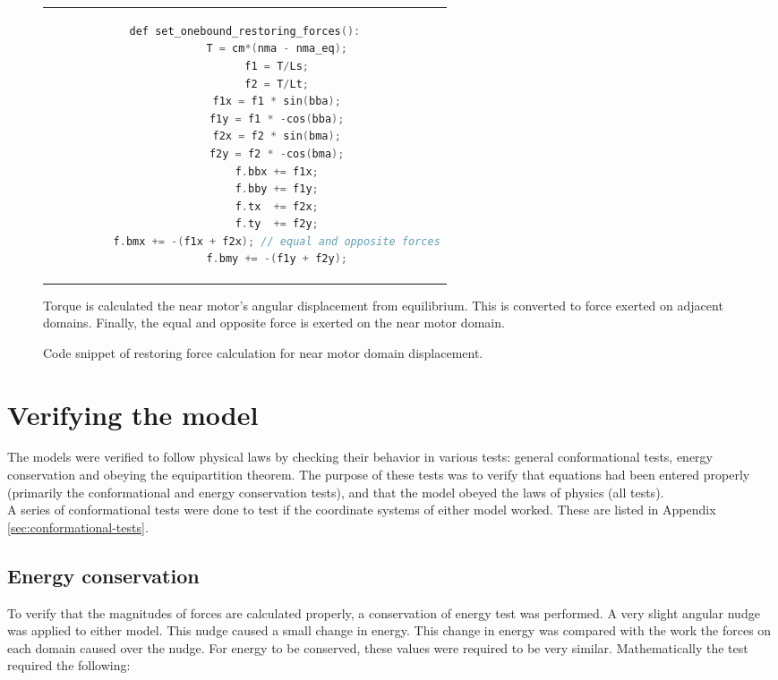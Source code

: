 \documentclass[
11pt, %
english, %
singlespacing, %
headsepline, %
chapterinoneline, %
]{MastersDoctoralThesis} %
\begin{document}
\begin{figure}[h]
  \centering
  \begin{tabular}{c}
    \begin{lstlisting}[language=C++]
      def set_onebound_restoring_forces():
          T = cm*(nma - nma_eq);
          f1 = T/Ls;
          f2 = T/Lt;
          f1x = f1 * sin(bba);
          f1y = f1 * -cos(bba);
          f2x = f2 * sin(bma);
          f2y = f2 * -cos(bma);
          f.bbx += f1x;
          f.bby += f1y;
          f.tx  += f2x;
          f.ty  += f2y;
          f.bmx += -(f1x + f2x); // equal and opposite forces
          f.bmy += -(f1y + f2y);
    \end{lstlisting}
  \end{tabular}
  \caption{Code snippet of restoring force calculation for near motor domain displacement.}{Torque is calculated the near motor's angular displacement from equilibrium. This is converted to force exerted on adjacent domains. Finally, the equal and opposite force is exerted on the near motor domain.}
  \label{snip:transition-rate-snippet}
\end{figure}

\section{Verifying the model}
The models were verified to follow physical laws by checking their behavior in various tests: general conformational tests, energy conservation and obeying the equipartition theorem. The purpose of these tests was to verify that equations had been entered properly (primarily the conformational and energy conservation tests), and that the model obeyed the laws of physics (all tests).\\

A series of conformational tests were done to test if the coordinate systems of either model worked. These are listed in Appendix \ref{sec:conformational-tests}.\\

\subsection{Energy conservation}
\label{sec:energy-conservation}
To verify that the magnitudes of forces are calculated properly, a conservation of energy test was performed. A very slight angular nudge was applied to either model. This nudge caused a small change in energy. This change in energy was compared with the work the forces on each domain caused over the nudge. For energy to be conserved, these values were required to be very similar. Mathematically the test required the following:
\end{document}
